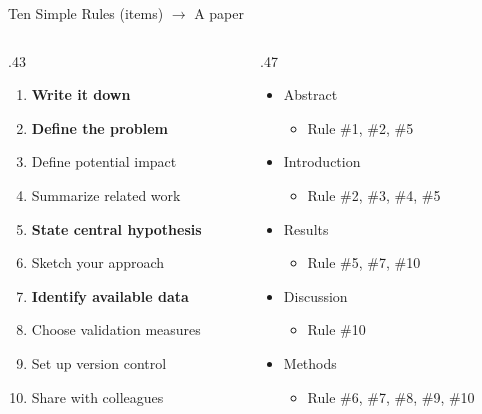 \documentclass[
  12pt,
  ignorenonframetext,
  aspectratio=169]{beamer}
\providecommand{\tightlist}{%
  \setlength{\itemsep}{0pt}\setlength{\parskip}{0pt}}
\begin{document}
\begin{frame}{Ten Simple Rules (items) \(\to\) A paper}
\protect{}\label{ten-simple-rules-items-to-a-paper}
\begin{columns}[T]
\begin{column}{.43\linewidth}
\begin{enumerate}
\tightlist
\item
  \textbf{\color{teal} Write it down}
\item
  \textbf{\color{teal} Define the problem}
\item
  Define potential impact
\item
  Summarize related work
\item
  \textbf{\color{teal} State central hypothesis}
\item
  Sketch your approach
\item
  \textbf{\color{teal} Identify available data}
\item
  Choose validation measures
\item
  Set up version control
\item
  Share with colleagues
\end{enumerate}
\end{column}

\begin{column}{.47\linewidth}
\begin{itemize}
\tightlist
\item
  Abstract

  \begin{itemize}
  \tightlist
  \item
    Rule \#1, \#2, \#5
  \end{itemize}
\item
  Introduction

  \begin{itemize}
  \tightlist
  \item
    Rule \#2, \#3, \#4, \#5
  \end{itemize}
\item
  Results

  \begin{itemize}
  \tightlist
  \item
    Rule \#5, \#7, \#10
  \end{itemize}
\item
  Discussion

  \begin{itemize}
  \tightlist
  \item
    Rule \#10
  \end{itemize}
\item
  Methods

  \begin{itemize}
  \tightlist
  \item
    Rule \#6, \#7, \#8, \#9, \#10
  \end{itemize}
\end{itemize}
\end{column}
\end{columns}
\end{frame}
\end{document}
